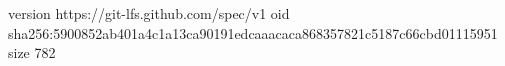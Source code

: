 version https://git-lfs.github.com/spec/v1
oid sha256:5900852ab401a4c1a13ca90191edcaaacaca868357821c5187c66cbd01115951
size 782
